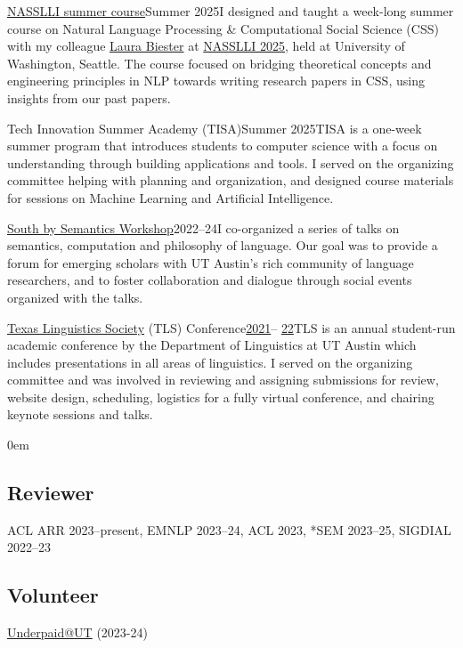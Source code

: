 \smallentry
  {\large \href{https://nasslli25-nlp-css.github.io}{NASSLLI summer course}}{\large Summer 2025}{I designed and taught a week-long summer course on Natural Language Processing \& Computational Social Science (CSS) with my colleague \href{https://www.laurabiester.com}{Laura Biester} at \href{https://nasslli25.shane.st}{NASSLLI 2025}, held at University of Washington, Seattle. The course focused on bridging theoretical concepts and engineering principles in NLP towards writing research papers in CSS, using insights from our past papers.}

\smallentry
  {\large Tech Innovation Summer Academy (TISA)}{\large Summer 2025}{TISA is a one-week summer program that introduces students to computer science with a focus on understanding through building applications and tools. I served on the organizing committee helping with planning and organization, and designed course materials for sessions on Machine Learning and Artificial Intelligence.}

\smallentry
  {\large \href{https://sites.google.com/utexas.edu/sxsw/archive}{South by Semantics Workshop}}{\large 2022--24}{I co-organized a series of talks on semantics, computation and philosophy of language. Our goal was to provide a forum for emerging scholars with UT Austin's rich community of language researchers, and to foster collaboration and dialogue through social events organized with the talks.}
  
\smallentry
    {\large \href{http://tls.ling.utexas.edu/}{Texas Linguistics Society} (TLS) Conference}{\large \href{http://tls.ling.utexas.edu/2021/}{2021}-- \href{http://tls.ling.utexas.edu/2022/}{22}}{TLS is an annual student-run academic conference by the Department of Linguistics at UT Austin which includes presentations in all areas of linguistics. I served on the organizing committee and was involved in reviewing and assigning submissions for review, website design, scheduling, logistics for a fully virtual conference, and chairing keynote sessions and talks.}

\leftskip0em\relax

\subsection{Reviewer}

\quad ACL ARR 2023--present, EMNLP 2023--24, ACL 2023, *SEM 2023--25, SIGDIAL 2022--23

\subsection{Volunteer}

\quad \href{http://underpaidatut.org}{Underpaid\makeatletter @\makeatother UT} (2023-24)
